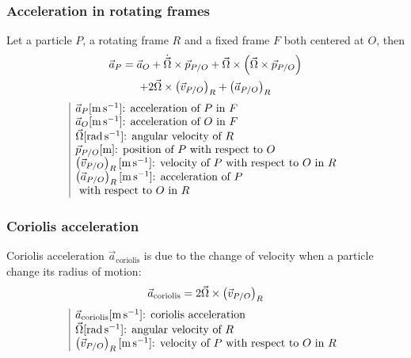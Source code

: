 \documentclass[10pt, twocolumn]{article}
\begin{document}
\subsubsection{Acceleration in rotating frames}
Let a particle \(P\), a rotating frame \(R\) and a fixed frame \(F\) both centered at \(O\), then
\begin{multline*}
  \vec{a}_P = \vec{a}_O + \dot{\vec{\Omega}} \times \vec{p}_{P/O} + \vec{\Omega} \times \left( \vec{\Omega} \times \vec{p}_{P/O} \right) \\
  + 2\vec{\Omega} \times \left( \vec{v}_{P/O} \right)_{R} + \left( \vec{a}_{P/O} \right)_{R}
\end{multline*}
\[
  \begin{array}{|l}
    \vec{a}_P [\si{\metre\per\second}] \text{: acceleration of } P \text{ in } F                                        \\
    \vec{a}_O [\si{\metre\per\second}] \text{: acceleration of } O \text{ in } F                                        \\
    \vec{\Omega} [\si{\radian\per\second}] \text{: angular velocity of } R                                              \\
    \vec{p}_{P/O} [\si{\metre}] \text{: position of } P \text{ with respect to } O                                      \\
    \left( \vec{v}_{P/O} \right)_{R} [\si{\metre\per\second}] \text{: velocity of } P \text{ with respect to } O \text{ in } R \\
    \left( \vec{a}_{P/O} \right)_{R} [\si{\metre\per\second}] \text{: acceleration of } P                                      \\
    \text{ with respect to } O \text{ in } R                                                                            \\
  \end{array}
\]


\subsubsection{Coriolis acceleration}
Coriolis acceleration \(\vec{a}_\mathrm{coriolis}\) is due to the change of velocity when a particle change its radius of motion:
\[
  \vec{a}_\mathrm{coriolis} = 2\vec{\Omega} \times \left( \vec{v}_{P/O} \right)_{R}
\]
\[
  \begin{array}{|l}
    \vec{a}_\mathrm{coriolis} [\si{\metre\per\second}] \text{: coriolis acceleration}                                   \\
    \vec{\Omega} [\si{\radian\per\second}] \text{: angular velocity of } R                                              \\
    \left( \vec{v}_{P/O} \right)_{R} [\si{\metre\per\second}] \text{: velocity of } P \text{ with respect to } O \text{ in } R \\
  \end{array}
\]
\end{document}
